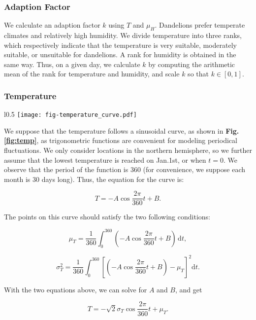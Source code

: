 \documentclass[12pt]{article}
\begin{document}
			
		
		\subsubsection{Adaption Factor}
		
			We calculate an adaption factor $k$ using $T$ and $\mu_H$.  Dandelions prefer temperate climates and relatively high humidity.  We divide temperature into three ranks, which respectively indicate that the temperature is very suitable, moderately suitable, or unsuitable for dandelions.  A rank for humidity is obtained in the same way.  Thus, on a given day, we calculate $k$ by computing the arithmetic mean of the rank for temperature and humidity, and scale $k$ so that $k \in [0, 1]$.
		
		
		
		\subsubsection{Temperature}
		
			\begin{wrapfigure}{l}{0.5\textwidth}
				\centering
				\texttt{[image: fig-temperature\_curve.pdf]}
				\caption{Temperature curve}
				\label{fig:temp}
			\end{wrapfigure}
			
			We suppose that the temperature follows a sinusoidal curve, as shown in \textbf{Fig.\ref{fig:temp}}, as trigonometric functions are convenient for modeling periodical fluctuations.  We only consider locations in the northern hemisphere, so we further assume that the lowest temperature is reached on Jan.1st, or when $t = 0$.  We observe that the period of the function is 360 (for convenience, we suppose each month is 30 days long).  Thus, the equation for the curve is:
			
			\[
				T = -A \cos{\frac{2\pi}{360} t} + B.
			\]
			
			The points on this curve should satisfy the two following conditions:
			
			\[
				\mu_T = \frac1{360} \int_0^{360} (-A \cos{\frac{2\pi}{360} t} + B) \, \mathrm{d}t,
			\]
			
			\[
				\sigma_T^2 = \frac1{360} \int_0^{360} \left[ (-A \cos{\frac{2\pi}{360} t} + B) - \mu_T \right] ^2 	\mathrm{d}t.
			\]
			
			With the two equations above, we can solve for $A$ and $B$, and get
			
			\begin{equation} \label{eq:temp}
				T = -\sqrt2 \sigma_T \cos{\frac{2\pi}{360} t} + \mu_T.
			\end{equation}
	
\end{document}
